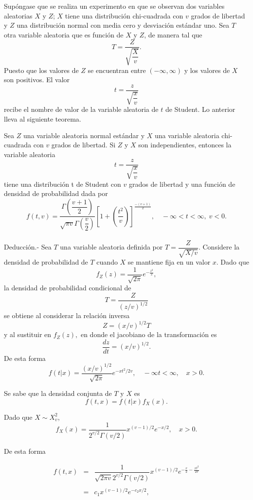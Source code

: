 Supóngase que se realiza un experimento en que se observan dos variables aleatorias $X$ y $Z$; $X$ tiene una distribución chi-cuadrada con $v$ grados de libertad y $Z$ una distribución normal con media cero y desviación estándar uno. Sea $T$ otra variable aleatoria que es función de $X$ y $Z$, de manera tal que
$$T=\dfrac{Z}{\sqrt{\dfrac{X}{v}}}.$$
Puesto que los valores de $Z$ se encuentran entre $(-\infty,\infty)$ y los valores de $X$ son positivos. El valor
$$t=\dfrac{z}{\sqrt{\dfrac{x}{v}}}$$
recibe el nombre de valor de la variable aleatoria de $t$ de Student. Lo anterior lleva al siguiente teorema.

\begin{teo}
    Sea $Z$ una variable aleatoria normal estándar y $X$ una variable aleatoria chi-cuadrada con $v$ grados de libertad. Si $Z$ y $X$ son independientes, entonces la variable aleatoria
$$t=\dfrac{z}{\sqrt{\dfrac{x}{v}}}$$
    tiene una distribución t de Student con $v$ grados de libertad y una función de densidad de probabilidad dada por
    $$f(t,v)=\dfrac{\Gamma\left(\dfrac{v+1}{2}\right)}{\sqrt{\pi v}\Gamma\left(\dfrac{v}{2}\right)}\left[1+\left(\dfrac{t^2}{v}\right)\right]^{\frac{-(v+1)}{2}}, \quad -\infty<t<\infty,\; v<0.$$\\
	Deducción.-\; Sea $T$ una variable aleatoria definida por  $T=\dfrac{Z}{\sqrt{X/v}}$. Considere la densidad de probabilidad  de $T$ cuando $X$ se mantiene fija en un valor $x$. Dado que
	$$f_Z(z)=\dfrac{1}{\sqrt{2\pi}}e^{-\frac{z^2}{2}},$$
	la densidad de probabilidad condicional de 
	$$T=\dfrac{Z}{(z/v)^{1/2}}$$
	se obtiene al considerar la relación inversa
	$$Z=(x/v)^{1/2}T$$
	y al sustituir en $f_Z(z),$ en donde el jacobiano de la transformación es
	$$\dfrac{dz}{dt}=(x/v)^{1/2}.$$
	De esta forma
	$$f(t|x)=\dfrac{(x/v)^{1/2}}{\sqrt{2\pi}}e^{-xt^2/2v},\quad -\infty t<\infty,\quad x>0.$$

	Se sabe que la densidad conjunta de $T$ y $X$ es
	$$f(t,x)=f(t|x)f_X(x).$$

	Dado que $X\sim X_v^2$,
	$$f_X(x)=\dfrac{1}{2^{v/2}\Gamma(v/2)}x^{(v-1)/2}e^{-x/2},\quad x>0.$$

	De esta forma

	$$
	\begin{array}{rcl}
	f(t,x)&=&\dfrac{1}{\sqrt{2\pi v} 2^{v/2}\Gamma(v/2)} x^{(v-1)/2}e^{-\frac{x}{2}-\frac{xt^2}{2v}}\\\\
	      &=& c_1x^{(v-1)/2}e^{-c_2x/2},
	\end{array}
	$$


\end{teo}
